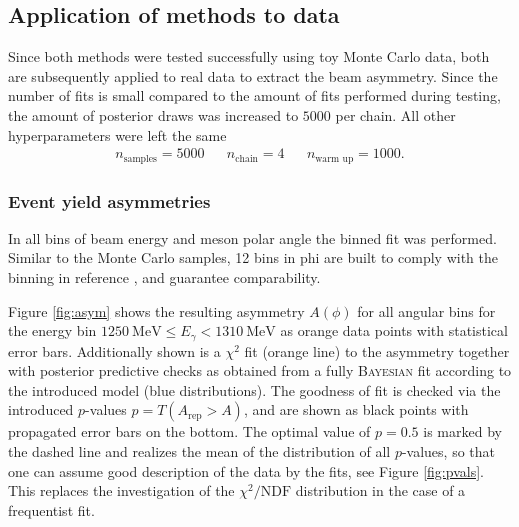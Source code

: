 \subsection{Application of methods to data}
Since both methods were tested successfully using toy Monte Carlo data, both are subsequently applied to real data to extract the beam asymmetry. Since the number of fits is small compared to the amount of fits performed during testing, the amount of posterior draws was increased to $5000$ per chain. All other hyperparameters were left the same
\begin{align}
	n_\text{samples}=5000 && n_\text{chain}=4 && n_\text{warm up}=1000.
\end{align}
\subsubsection{Event yield asymmetries}
In all bins of beam energy and meson polar angle the binned fit was performed. Similar to the Monte Carlo samples, 12 bins in phi are built to comply with the binning in reference \cite{farahphd}, and guarantee comparability.

Figure \ref{fig:asym} shows the resulting asymmetry $A(\phi)$ for all angular bins for the energy bin $\SI{1250}{\mega\eV}\leq E_\gamma<\SI{1310}{\mega\eV}$ as orange data points with statistical error bars.  Additionally shown is a $\chi^2$ fit (orange line) to the asymmetry together with posterior predictive checks as obtained from a fully \textsc{Bayesian} fit according to the introduced model (blue distributions). The goodness of fit is checked via the introduced $p$-values $p=T(A_\text{rep}>A)$, and are shown as black points with propagated error bars on the bottom. The optimal value of $p=0.5$ is marked by the dashed line and realizes the mean of the distribution of all $p$-values, so that one can assume good description of the data by the fits, see Figure \ref{fig:pvals}. This replaces the investigation of the $\chi^2/\text{NDF}$ distribution in the case of a frequentist fit.   
\newpage

